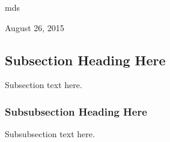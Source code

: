 \documentclass[journal]{IEEEtran}
\begin{document}
\hfill mds
 
\hfill August 26, 2015

\subsection{Subsection Heading Here}
Subsection text here.


\subsubsection{Subsubsection Heading Here}
Subsubsection text here.


%
%



%
%
\end{document}
